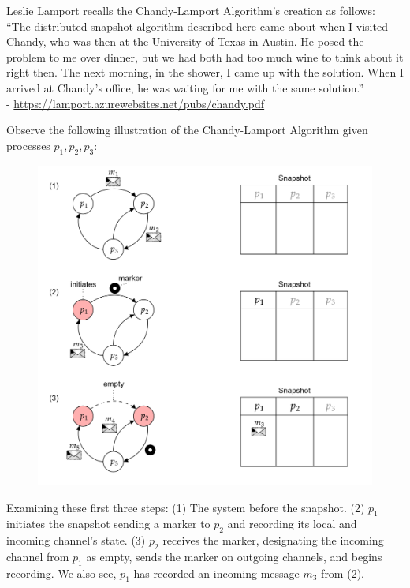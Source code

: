 \begin{Tip} Leslie Lamport recalls the Chandy-Lamport Algorithm's creation as follows:\\
    ``The distributed snapshot algorithm described here came
    about when I visited Chandy, who was then at the
    University of Texas in Austin. He posed the problem to me
    over dinner, but we had both had too much wine to think
    about it right then. The next morning, in the shower, I came
    up with the solution. When I arrived at Chandy's office, he
    was waiting for me with the same solution.''\\

    \noindent
    - \href{https://lamport.azurewebsites.net/pubs/chandy.pdf}{https://lamport.azurewebsites.net/pubs/chandy.pdf}
\end{Tip}

\newpage 

\noindent 
Observe the following illustration of the Chandy-Lamport Algorithm given processes $p_1, p_2, p_3$:
\begin{figure}[h] 
    \centering
    \includegraphics[width=1\textwidth]{Sections/snap/snap_exe.png}
\end{figure}

\noindent
Examining these first three steps: (1) The system before the snapshot. (2) $p_1$ initiates the snapshot sending a marker to $p_2$ and recording its local and incoming channel's state. 
(3) $p_2$ receives the marker, designating the incoming channel from $p_1$ as empty, sends the marker on outgoing channels, and begins recording. We also see, $p_1$ has recorded an incoming message $m_3$ from (2).\\

